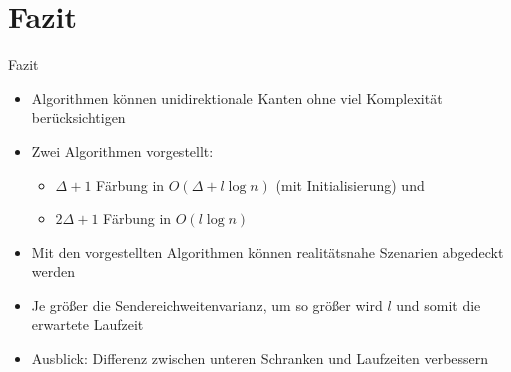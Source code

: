 \documentclass[18pt]{beamer}
\begin{document}
\section{Fazit}
\begin{frame}{Fazit}
	\begin{itemize}
		\item Algorithmen können unidirektionale Kanten ohne viel Komplexität berücksichtigen
		\pause
		\item Zwei Algorithmen vorgestellt: 
		\begin{itemize}
			\item $\Delta+1$ Färbung in $O(\Delta+l \log n)$ (mit Initialisierung) und
			\item $2\Delta+1$ Färbung in $O(l \log n)$
		\end{itemize}
		\pause
		\item Mit den vorgestellten Algorithmen können realitätsnahe Szenarien abgedeckt werden
		\pause
		\item Je größer die Sendereichweitenvarianz, um so größer wird $l$ und somit die erwartete Laufzeit
		\pause
		\item Ausblick: Differenz zwischen unteren Schranken und Laufzeiten verbessern
	\end{itemize}
\end{frame}
\end{document}
